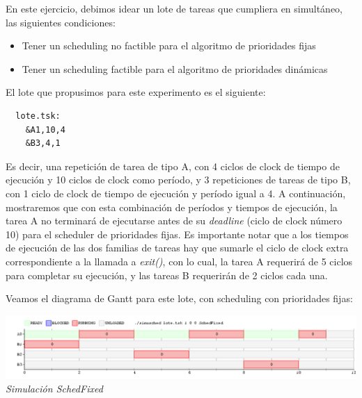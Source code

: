 En este ejercicio, debimos idear un lote de tareas que cumpliera en simult\'aneo, las siguientes condiciones:

\begin{itemize}
 \item Tener un scheduling no factible para el algoritmo de prioridades fijas
 \item Tener un scheduling factible para el algoritmo de prioridades din\'amicas
\end{itemize}

El lote que propusimos para este experimento es el siguiente:

\begin{verbatim}
  lote.tsk:
    &A1,10,4
    &B3,4,1
\end{verbatim}

Es decir, una repetici\'on de tarea de tipo A, con 4 ciclos de clock de tiempo de ejecuci\'on y 10 ciclos de clock como per\'iodo, y 3 repeticiones 
de tareas de tipo B, con 1 ciclo de clock de tiempo de ejecuci\'on y per\'iodo igual a 4. A continuaci\'on, mostraremos que con esta combinaci\'on
de per\'iodos y tiempos de ejecuci\'on, la tarea A no terminar\'a de ejecutarse antes de su \textit{deadline} (ciclo de clock n\'umero 10) 
para el scheduler de prioridades fijas. Es importante notar que a los tiempos de ejecuci\'on de las dos familias de tareas hay que sumarle el ciclo
de clock extra correspondiente a la llamada a \textit{exit()}, con lo cual, la tarea A requerir\'a de 5 ciclos para completar su ejecuci\'on, y las tareas 
B requerir\'an de 2 ciclos cada una.

Veamos el diagrama de Gantt para este lote, con scheduling con prioridades fijas:

\vspace{\baselineskip}
\begin{center}
\includegraphics[scale=0.45]{../tp1/Test/ejercicio9-1.png}
\\
\vspace{1pt}
\footnotesize\textit{Simulaci\'on SchedFixed}
\end{center}
\vspace{\baselineskip}

